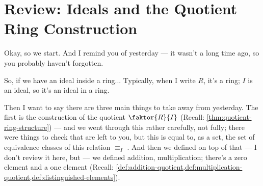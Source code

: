 \section{Review: Ideals and the Quotient Ring Construction}

\begin{speech}[00:00:05 - 00:01:10]
Okay, so we start. And I remind you of yesterday --- it wasn't a long time ago, so you probably haven't forgotten.

So, if we have an ideal inside a ring... Typically, when I write $R$, it's a ring; $I$ is an ideal, so it's an ideal  in a ring.

Then I want to say there are three main things to take away from yesterday. The first  is the construction of the quotient $\faktor{R}{I}$ (Recall: \cref{thm:quotient-ring-structure}) --- and we went through this rather carefully, not fully; there were things to check that are left to you, but this is equal to, as a set, the set of equivalence classes of this relation $\equiv_I$ . And then we defined on top of that --- I don't review it here, but --- we defined addition, multiplication; there's a zero element and a one element (Recall: \cref{def:addition-quotient,def:multiplication-quotient,def:distinguished-elements}). 
\end{speech}

